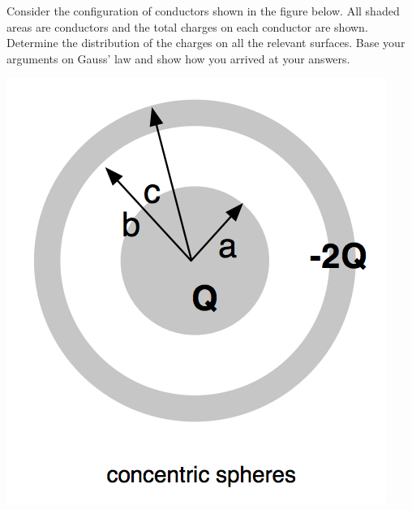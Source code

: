 \documentclass[12pt,letterpaper,boxed,cm]{hmcpset}
\begin{document}
\newpage
\begin{problem}[SUP27*]
	Consider the configuration of conductors shown in the figure below. All shaded areas are conductors and the total charges on each conductor are shown. Determine the distribution of the charges on all the relevant surfaces. Base your arguments on Gauss' law and show how you arrived at your answers.
	\begin{center}
		\includegraphics[scale=0.7]{02.png}
	\end{center}
\end{problem}
\begin{solution}
\end{solution}
\end{document}
